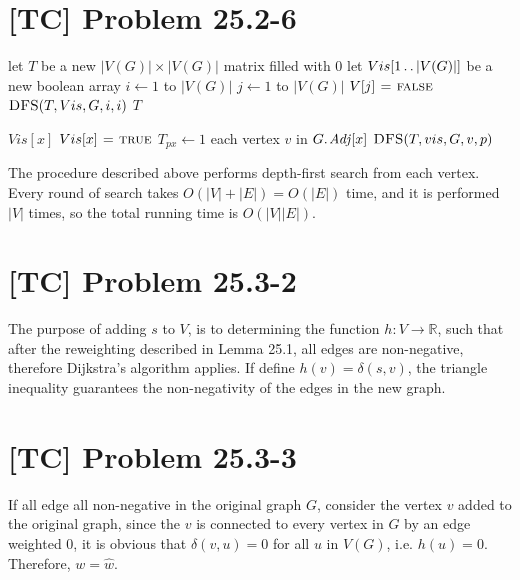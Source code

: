 \documentclass[a4paper,11pt,twocolumn]{article}
\newcommand{\FALSE}{\const{false}}
\newcommand{\TRUE}{\const{true}}
\begin{document}
  \section{[TC] Problem 25.2-6}
   \begin{codebox}
    \li let $T$ be a new $|V(G)| \times |V(G)|$ matrix filled with 0
    \li let $Vis[1 \mathinner{\ldotp\ldotp} |V(G)|]$ be a new boolean array
    \li \For $i \gets 1$ to $|V(G)|$
    \li \Do  \For $j \gets 1$ to $|V(G)|$
    \li      \Do  $V[j] \gets \FALSE$
             \End
    \li      $\textnormal{\scshape DFS}(T, Vis, G, i, i)$
        \End
    \li \Return $T$
  \end{codebox}
  \begin{codebox}
    \li \If $Vis[x]$
    \li \Do \Return
        \End
    \li $Vis[x] \gets \TRUE$
    \li $T_{px} \gets 1$
    \li \For each vertex $v$ in $\attrib{G}{Adj}[x]$
    \li \Do  $\textnormal{\scshape DFS}(T, vis, G, v, p)$
        \End
  \end{codebox}
  The procedure described above performs depth-first search from each vertex. Every round of search takes $O(|V|+|E|) = O(|E|)$ time, and it is performed $|V|$ times, so the total running time is $O(|V||E|)$.

  \section{[TC] Problem 25.3-2}
  The purpose of adding $s$ to $V$, is to determining the  function $h : V \rightarrow \mathbb{R}$, such that after the reweighting described in Lemma 25.1, all edges are non-negative, therefore Dijkstra's algorithm applies. If define $h(v) = \delta(s, v)$, the triangle inequality guarantees the non-negativity of the edges in the new graph.

  \section{[TC] Problem 25.3-3}
  If all edge all non-negative in the original graph $G$, consider the vertex $v$ added to the original graph, since the $v$ is connected to every vertex in $G$ by an edge weighted 0, it is obvious that $\delta(v, u) = 0$ for all $u$ in $V(G)$, i.e. $h(u) = 0$. Therefore, $w = \hat{w}$.
\end{document}
